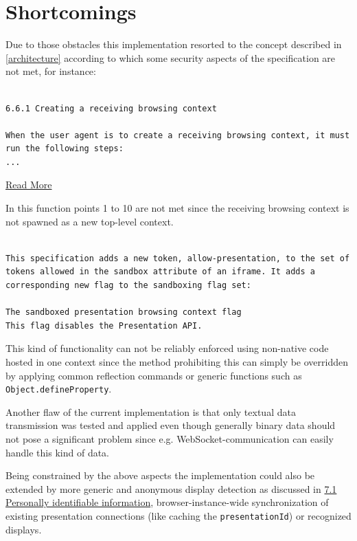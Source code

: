 \documentclass[journal]{IEEEtran}
\begin{document}
\section{Shortcomings}
\label{shortcomings}
Due to those obstacles this implementation resorted to the concept described in  \ref{architecture} according to which some security aspects of the specification are not met, for instance:

\begin{lstlisting}

6.6.1 Creating a receiving browsing context

When the user agent is to create a receiving browsing context, it must run the following steps:
...
\end{lstlisting}



\href{https://w3c.github.io/presentation-api/\#creating-a-receiving-browsing-context}{Read More}

In this function points 1 to 10 are not met since the receiving browsing context is not spawned as a new top-level context.

\begin{lstlisting}

This specification adds a new token, allow-presentation, to the set of tokens allowed in the sandbox attribute of an iframe. It adds a corresponding new flag to the sandboxing flag set:

The sandboxed presentation browsing context flag
This flag disables the Presentation API.
\end{lstlisting}



This kind of functionality can not be reliably enforced using non-native code hosted in one context since the method prohibiting this can simply be overridden by applying common reflection commands or generic functions such as  {\lstinline[style=inline]$Object.defineProperty$}.

Another flaw of the current implementation is that only textual data transmission was tested and applied even though generally binary data should not pose a significant problem since e.g. WebSocket-communication can easily handle this kind of data.

Being constrained by the above aspects the implementation could also be extended by more generic and anonymous display detection as discussed in \href{https://w3c.github.io/presentation-api/\#personally-identifiable-information}{7.1 Personally identifiable information}, browser-instance-wide synchronization of existing presentation connections (like caching the  {\lstinline[style=inline]$presentationId$}) or recognized displays.
\end{document}
